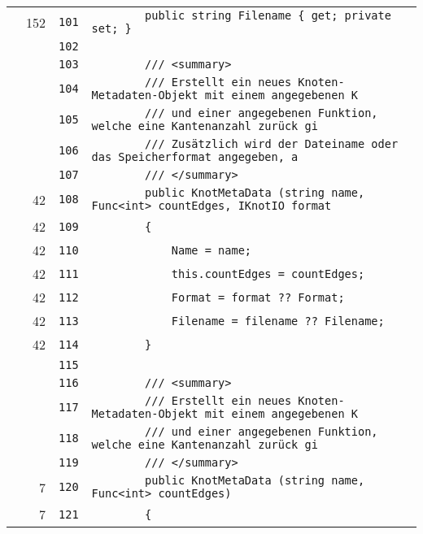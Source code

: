 \documentclass[a4paper,10pt]{article}
\begin{document}
\begin{longtable}[l]{lrrl}
\cellcolor{green} & 152 & \verb~101~ & \verb~        public string Filename { get; private set; }~\\
\cellcolor{gray} &  & \verb~102~ & \verb~~\\
\cellcolor{gray} &  & \verb~103~ & \verb~        /// <summary>~\\
\cellcolor{gray} &  & \verb~104~ & \verb~        /// Erstellt ein neues Knoten-Metadaten-Objekt mit einem angegebenen K~\\
\cellcolor{gray} &  & \verb~105~ & \verb~        /// und einer angegebenen Funktion, welche eine Kantenanzahl zurück gi~\\
\cellcolor{gray} &  & \verb~106~ & \verb~        /// Zusätzlich wird der Dateiname oder das Speicherformat angegeben, a~\\
\cellcolor{gray} &  & \verb~107~ & \verb~        /// </summary>~\\
\cellcolor{green} & 42 & \verb~108~ & \verb~        public KnotMetaData (string name, Func<int> countEdges, IKnotIO format~\\
\cellcolor{green} & 42 & \verb~109~ & \verb~        {~\\
\cellcolor{green} & 42 & \verb~110~ & \verb~            Name = name;~\\
\cellcolor{green} & 42 & \verb~111~ & \verb~            this.countEdges = countEdges;~\\
\cellcolor{green} & 42 & \verb~112~ & \verb~            Format = format ?? Format;~\\
\cellcolor{green} & 42 & \verb~113~ & \verb~            Filename = filename ?? Filename;~\\
\cellcolor{green} & 42 & \verb~114~ & \verb~        }~\\
\cellcolor{gray} &  & \verb~115~ & \verb~~\\
\cellcolor{gray} &  & \verb~116~ & \verb~        /// <summary>~\\
\cellcolor{gray} &  & \verb~117~ & \verb~        /// Erstellt ein neues Knoten-Metadaten-Objekt mit einem angegebenen K~\\
\cellcolor{gray} &  & \verb~118~ & \verb~        /// und einer angegebenen Funktion, welche eine Kantenanzahl zurück gi~\\
\cellcolor{gray} &  & \verb~119~ & \verb~        /// </summary>~\\
\cellcolor{green} & 7 & \verb~120~ & \verb~        public KnotMetaData (string name, Func<int> countEdges)~\\
\cellcolor{green} & 7 & \verb~121~ & \verb~        {~\\

\end{longtable}
\end{document}
